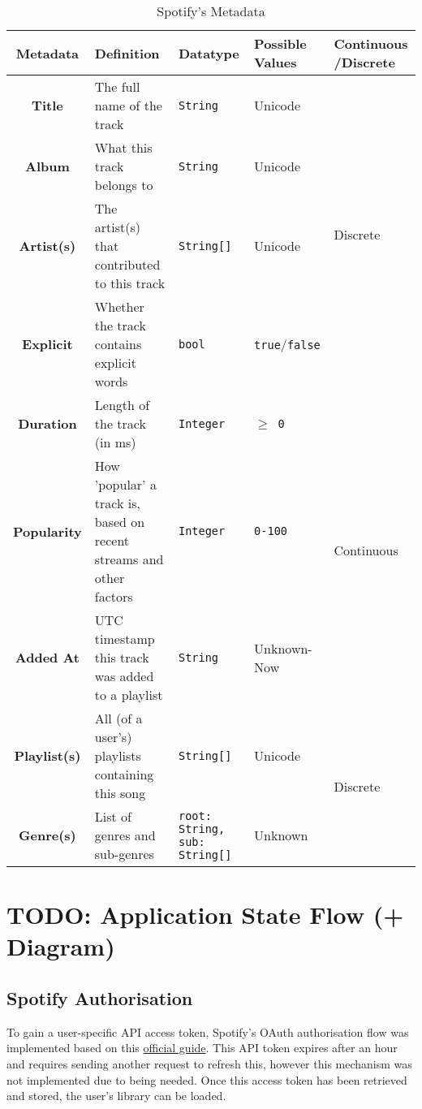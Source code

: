 \begin{longtable}[c]{|c|p{7.5em}|p{7.5em}|p{5em}|p{5.5em}|}
    \caption{Spotify's Metadata}\\%
    \toprule
    \textbf{Metadata} & \textbf{Definition} & \textbf{Datatype} & \textbf{Possible Values} & \textbf{Continuous /Discrete} \\
    \midrule
    \endfirsthead

    \textbf{Title} & The full name of the track & \texttt{String} & Unicode & \multirow{4}{*}{Discrete} \\*
    \cmidrule{1-4}
    \textbf{Album} & What this track belongs to & \texttt{String} & Unicode & \\*
    \cmidrule{1-4}
    \textbf{Artist(s)} & The artist(s) that contributed to this track & \texttt{String[]} & Unicode & \\*
    \cmidrule{1-4}
    \textbf{Explicit} & Whether the track contains explicit words & \texttt{bool} & \texttt{true}/\texttt{false} & \\*
    \cmidrule{1-5}
    \textbf{Duration} & Length of the track (in ms) & \texttt{Integer} & \texttt{\(\ge\) 0} & \multirow{3}{*}{Continuous}\\*
    \cmidrule{1-4}
    \textbf{Popularity} & How 'popular' a track is, based on recent streams and other factors& \texttt{Integer} & \texttt{0-100} & \\*
    \cmidrule{1-4}
    \textbf{Added At} & UTC timestamp this track was added to a playlist & \texttt{String} & Unknown-Now&\\*
    \cmidrule{1-5}
    \textbf{Playlist(s)} & All (of a user's) playlists containing this song & \texttt{String[]} & Unicode & \multirow{2}{*}{Discrete}\\*
    \cmidrule{1-4}
    \textbf{Genre(s)} & List of genres and sub-genres & \texttt{root: String, sub: String[]} & Unknown &\\*
    \midrule
\end{longtable}

\section{TODO: Application State Flow (+ Diagram)}
\subsection{Spotify Authorisation}
To gain a user-specific API access token, Spotify's OAuth authorisation flow was implemented based on this \href{https://developer.spotify.com/documentation/web-api/tutorials/code-pkce-flow}{official guide}. This API token expires after an hour and requires sending another request to refresh this, however this mechanism was not implemented due to being needed. Once this access token has been retrieved and stored, the user's library can be loaded.

